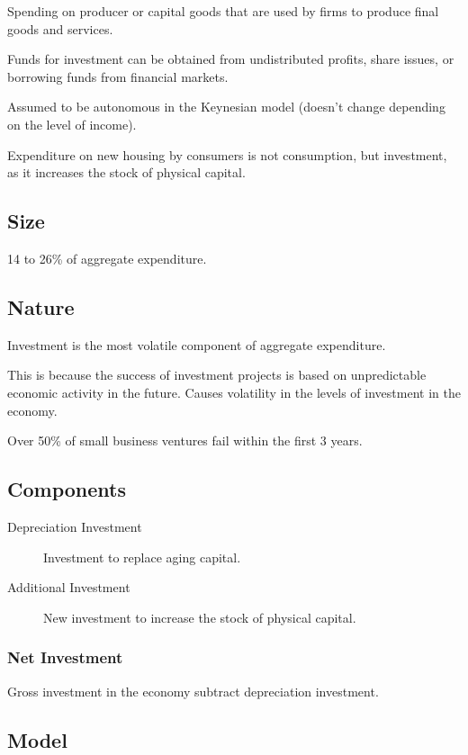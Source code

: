 \documentclass[a4paper,11pt]{article}
\begin{document}
Spending on producer or capital goods that are used by firms to produce final
goods and services.

Funds for investment can be obtained from undistributed profits, share issues,
or borrowing funds from financial markets.

Assumed to be autonomous in the Keynesian model (doesn't change depending on
the level of income).

Expenditure on new housing by consumers is not consumption, but investment,
as it increases the stock of physical capital.


\subsection{Size}

14 to 26\% of aggregate expenditure.


\subsection{Nature}

Investment is the most volatile component of aggregate expenditure.

This is because the success of investment projects is based on unpredictable
economic activity in the future. Causes volatility in the levels of investment
in the economy.

Over 50\% of small business ventures fail within the first 3 years.


\subsection{Components}

\begin{description}
\item [Depreciation Investment] Investment to replace aging capital.
\item [Additional Investment] New investment to increase the stock of physical
	capital.
\end{description}


\subsubsection{Net Investment}

Gross investment in the economy subtract depreciation investment.


\subsection{Model}
\end{document}

